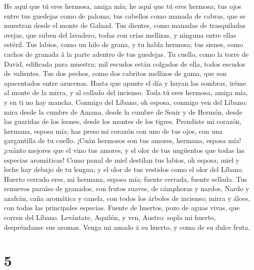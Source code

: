  He aquí que tú eres hermosa, amiga mía; he aquí que tú
eres hermosa; tus ojos entre tus guedejas como de paloma; tus cabellos
como manada de cabras, que se muestran desde el monte de Galaad.
 Tus dientes, como manadas de trasquiladas ovejas, que
suben del lavadero, todas con crías mellizas, y ninguna entre ellas
estéril.  Tus labios, como un hilo de grana, y tu habla
hermosa; tus sienes, como cachos de granada á la parte adentro de tus
guedejas.  Tu cuello, como la torre de David, edificada
para muestra; mil escudos están colgados de ella, todos escudos de
valientes.  Tus dos pechos, como dos cabritos mellizos de
gama, que son apacentados entre azucenas.  Hasta que
apunte el día y huyan las sombras, iréme al monte de la mirra, y al
collado del incienso.  Toda tú eres hermosa, amiga mía, y
en ti no hay mancha.  Conmigo del Líbano, oh esposa,
conmigo ven del Líbano: mira desde la cumbre de Amana, desde la cumbre
de Senir y de Hermón, desde las guaridas de los leones, desde los montes
de los tigres.  Prendiste mi corazón, hermana, esposa mía;
has preso mi corazón con uno de tus ojos, con una gargantilla de tu
cuello.  ¡Cuán hermosos son tus amores, hermana, esposa
mía! ¡cuánto mejores que el vino tus amores, y el olor de tus ungüentos
que todas las especias aromáticas!  Como panal de miel
destilan tus labios, oh esposa; miel y leche hay debajo de tu lengua; y
el olor de tus vestidos como el olor del Líbano.  Huerto
cerrado eres, mi hermana, esposa mía; fuente cerrada, fuente sellada.
 Tus renuevos paraíso de granados, con frutos suaves, de
cámphoras y nardos,  Nardo y azafrán, caña aromática y
canela, con todos los árboles de incienso; mirra y áloes, con todas las
principales especias.  Fuente de huertos, pozo de aguas
vivas, que corren del Líbano.  Levántate, Aquilón, y ven,
Austro: sopla mi huerto, despréndanse sus aromas. Venga mi amado á su
huerto, y coma de su dulce fruta.

\hypertarget{section-4}{%
\section{5}\label{section-4}}

